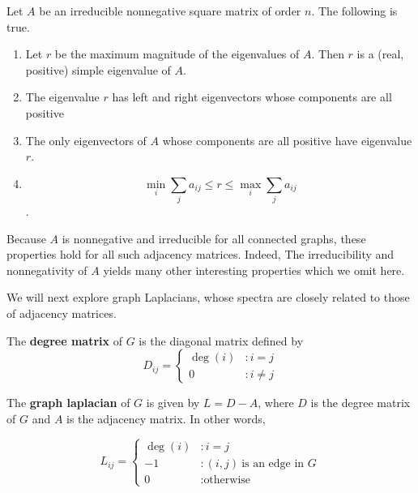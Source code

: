 \begin{theorem}
  Let $A$ be an irreducible nonnegative square matrix of order $n$. The
  following is true.

  \begin{enumerate}
  \item Let $r$ be the maximum magnitude of the eigenvalues of $A$. Then $r$ is
    a (real, positive) simple eigenvalue of $A$.
  \item The eigenvalue $r$ has left and right eigenvectors whose components are
    all positive
  \item The only eigenvectors of $A$ whose components are all positive have
    eigenvalue $r$.
  \item
    \[ \min_i \sum_j a_{ij} \leq r \leq \max_i \sum_j a_{ij} \].
  \end{enumerate}
\end{theorem}

Because $A$ is nonnegative and irreducible for all connected graphs, these
properties hold for all such adjacency matrices. Indeed, The irreducibility and
nonnegativity of $A$ yields many other interesting properties which we omit
here.

We will next explore graph Laplacians, whose spectra are closely related to
those of adjacency matrices.

\begin{definition}
  The \textbf{degree matrix} of $G$ is the diagonal matrix defined by
  \[
    D_{ij} = \begin{cases}
      \deg(i) &: i = j \\
      0 &: i \neq j
    \end{cases}
  \]
\end{definition}

\begin{definition}
  The \textbf{graph laplacian} of $G$ is given by $L = D - A$, where $D$ is the
  degree matrix of $G$ and $A$ is the adjacency matrix. In other words,

  \[
    L_{ij} = \begin{cases}
      \deg(i) &: i=j \\
      -1 &: (i,j) ~\text{is an edge in $G$} \\
      0 &: \text{otherwise}
    \end{cases}
  \]
\end{definition}


